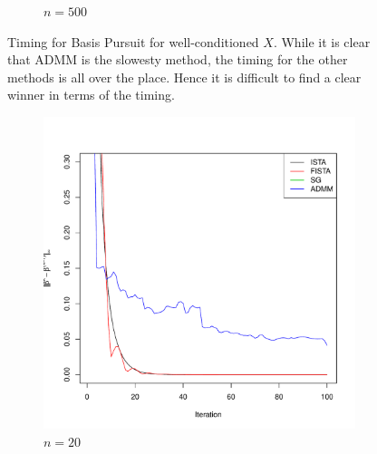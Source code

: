 \documentclass[12pt, leqno]{article}
\theoremstyle{remark}
\begin{document}
\begin{figure}[H]
\begin{subfigure}[b]{0.4\textwidth}
        \caption{$n=500$}
        \label{fig:500}
    \end{subfigure}
\caption{Timing for Basis Pursuit for well-conditioned $X$. While it is clear that ADMM is the slowesty method, the timing for the other methods is all over the place. Hence it is difficult to find a clear winner in terms of the timing.}
\label{fig:timing}
\end{figure}

\begin{figure}[H]
  \centering
    \begin{subfigure}[b]{0.4\textwidth}
        \includegraphics[width=\textwidth]{20cvgc-cn.pdf}
        \caption{$n=20$}
        \label{fig:20}
    \end{subfigure}
~
    \begin{subfigure}[b]{0.4\textwidth}

\end{subfigure}
\end{figure}
\end{document}
